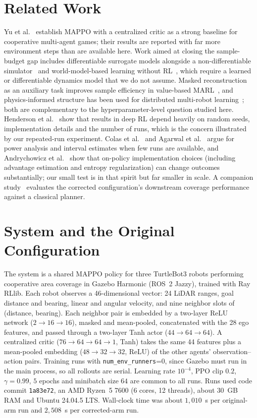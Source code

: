 \documentclass[12pt]{article}
\begin{document}
\section{Related Work}
Yu et al.~\cite{yu2022mappo} establish MAPPO with a centralized critic as a
strong baseline for cooperative multi-agent games; their results are
reported with far more environment steps than are available here. Work aimed
at closing the sample-budget gap includes differentiable surrogate models
alongside a non-differentiable simulator~\cite{asymmetricphysics2026} and
world-model-based learning without RL~\cite{agilemotor2024}, which require a
learned or differentiable dynamics model that we do not assume. Masked
reconstruction as an auxiliary task improves sample efficiency in
value-based MARL~\cite{maskedreconstruction2023}, and physics-informed
structure has been used for distributed multi-robot
learning~\cite{physicsinformedmarl2024}; both are complementary to the
hyperparameter-level question studied here. Henderson et
al.~\cite{henderson2018deep} show that results in deep RL depend heavily on
random seeds, implementation details and the number of runs, which is the
concern illustrated by our repeated-run experiment. Colas et al.~\cite{colas2018many} and
Agarwal et al.~\cite{agarwal2021precipice} argue for power analysis and
interval estimates when few runs are available, and Andrychowicz et
al.~\cite{andrychowicz2021matters} show that on-policy implementation
choices (including advantage estimation and entropy regularization) can
change outcomes substantially; our small test is in that spirit but far
smaller in scale. A companion study~\cite{pandhe2026mappo}
evaluates the corrected configuration's downstream coverage performance
against a classical planner.

\section{System and the Original Configuration}
\label{sec:system}
The system is a shared MAPPO policy for three TurtleBot3 robots performing
cooperative area coverage in Gazebo Harmonic (ROS~2 Jazzy), trained with Ray
RLlib. Each robot observes a 46-dimensional vector: 24 LiDAR ranges, goal
distance and bearing, linear and angular velocity, and nine neighbor slots of
(distance, bearing). Each neighbor pair is embedded by a two-layer ReLU
network ($2\to16\to16$), masked and mean-pooled, concatenated with the 28 ego
features, and passed through a two-layer Tanh actor ($44\to64\to64$). A
centralized critic ($76\to64\to64\to1$, Tanh) takes the same 44 features plus
a mean-pooled embedding ($48\to32\to32$, ReLU) of the other agents'
observation--action pairs. Training runs with \texttt{num\_env\_runners}=0,
since Gazebo must run in the main process, so all rollouts are serial.
Learning rate $10^{-4}$, PPO clip $0.2$, $\gamma=0.99$, $5$ epochs and
minibatch size $64$ are common to all runs. Runs used code commit \texttt{1a83e72}, an AMD Ryzen~5 7600 (6 cores, 12 threads), about 30~GB RAM and Ubuntu 24.04.5 LTS. Wall-clock time was about $1{,}010$~s per original-arm run and $2{,}508$~s per corrected-arm run.
\end{document}
